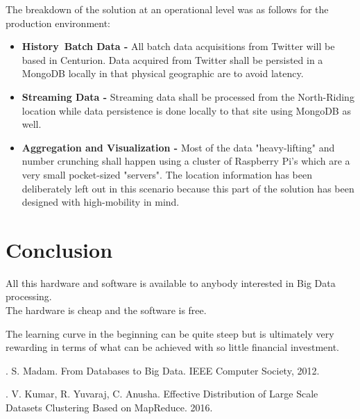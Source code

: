 \documentclass[12pt]{article} %
\begin{document}
	The breakdown of the solution at an operational level was as follows for the production environment:
	
	\begin{itemize}
		\item \textbf{History\ Batch Data -} All batch data acquisitions from Twitter will be based in Centurion. Data acquired from Twitter shall be persisted in a MongoDB locally in that physical geographic are to avoid latency.
		\item \textbf{Streaming Data -} Streaming data shall be processed from the North-Riding location while data persistence is done locally to that site using MongoDB as well.
		\item \textbf{Aggregation and Visualization -} Most of the data "heavy-lifting" and number crunching shall happen using a cluster of Raspberry Pi's which are a very small pocket-sized "servers". The location information has been deliberately left out in this scenario because this part of the solution has been designed with high-mobility in mind.
	\end{itemize}
	
	
	\section{Conclusion} %
	
	All this hardware and software is available to anybody interested in Big Data processing.\\
	
	The hardware is cheap and the software is free.\
	
	The learning curve in the beginning can be quite steep but is ultimately very rewarding in terms of what can be achieved with so little financial investment.
	
	
	
	
	\newpage
	
	
	\begin{thebibliography}{99} %
		
		. S. Madam. From Databases to Big Data. IEEE Computer Society, 2012.
	
		
		. V. Kumar, R. Yuvaraj, C. Anusha. Effective Distribution of Large Scale Datasets Clustering Based on MapReduce. 2016.

		
	\end{thebibliography}
	
\end{document}
